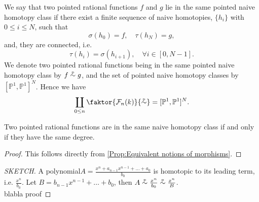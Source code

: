 %
%
%
\begin{definition}\label{Def:Pointed naive homotopyclass}
%
We say that two pointed rational functions \(f\) and \(g\) lie in the same pointed naive homotopy class if there exist a finite sequence of naive homotopies, \(\{h_i\}\) with \( 0 \leq i \leq N \), such that
%
\begin{equation}
\sigma(h_0) = f, \quad \tau(h_N) = g,
\end{equation} 
%
and, they are connected, i.e.
%
\begin{equation}
\tau(h_i) = \sigma(h_{i+1}), \quad \forall i \in [0,N-1] .
\end{equation}
%
We denote two pointed rational functions being in the same pointed naive homotopy class by \(f \htpy g\), and the set of pointed naive homotopy classes by \([\mathbb{P}^1, \mathbb{P}^1]^N\). Hence we have
%
\begin{equation}
\coprod_{0\leq n} \faktor{\mathcal{F}_n(k)}{\htpy}   = [\mathbb{P}^1, \mathbb{P}^1]^N.
\end{equation}
%
\end{definition}
%
\begin{corollary}\label{Cor:when does two functions lie in the same homotopyclass}
Two pointed rational functions are in the same naive homotopy class if and only if they have the same degree.
%
\begin{proof}
This follows directly from \cref{Prop:Equivalent notions of morphisms}.
\end{proof}
%
\end{corollary}
%
\iffalse
\begin{proof}
[SKETCH] A polynomial\(A=\frac{x^n+a_{n-1}x^{n-1}+\dots+a_0}{b_0}\) is homotopic to its leading term, i.e. \(\frac{x^n}{b_0}\).
Let \(B= b_{n-1}x^{n-1}+\dots+b_0\), then \(A \htpy \frac{x^n}{b_0} \htpy \frac{x^n}{B}\).\\
blabla proof
\end{proof}

